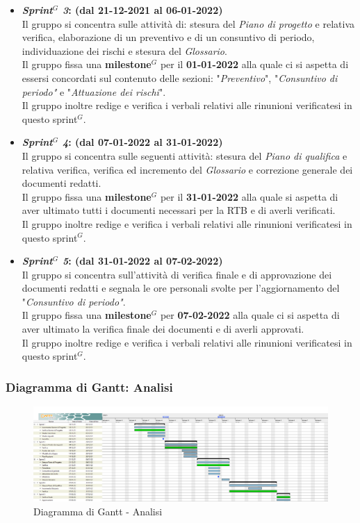 \begin{itemize}
    \item \textbf{\textit{Sprint$^{G}$ 3}: (dal 21-12-2021 al 06-01-2022)}\\
    Il gruppo si concentra sulle attività di: stesura del \textit{Piano di progetto} e relativa verifica, elaborazione di un preventivo e di un consuntivo di periodo, individuazione dei rischi e stesura del \textit{Glossario}.\\
    Il gruppo fissa una \textbf{milestone$^{G}$} per il \textbf{01-01-2022} alla quale ci si aspetta di essersi concordati sul contenuto delle sezioni: "\textit{Preventivo}", "\textit{Consuntivo di periodo"} e "\textit{Attuazione dei rischi}".\\
    Il gruppo inoltre redige e verifica i verbali relativi alle rinunioni verificatesi in questo sprint$^{G}$.

    \item \textbf{\textit{Sprint$^{G}$ 4}: (dal 07-01-2022 al 31-01-2022)}\\
    Il gruppo si concentra sulle seguenti attività: stesura del \textit{Piano di qualifica} e relativa verifica, verifica ed incremento del \textit{Glossario} e correzione generale dei documenti redatti.\\
    Il gruppo fissa una \textbf{milestone$^{G}$} per il \textbf{31-01-2022} alla quale si aspetta di aver ultimato tutti i documenti necessari per la RTB e di averli verificati.\\
    Il gruppo inoltre redige e verifica i verbali relativi alle rinunioni verificatesi in questo sprint$^{G}$.

    \item \textbf{\textit{Sprint$^{G}$ 5}: (dal 31-01-2022 al 07-02-2022)}\\
    Il gruppo si concentra sull'attività di verifica finale e di approvazione dei documenti redatti  e segnala le ore personali svolte per l'aggiornamento del "\textit{Consuntivo di periodo"}. \\
    Il gruppo fissa una \textbf{milestone$^{G}$} per \textbf{07-02-2022} alla quale ci si aspetta di aver ultimato la verifica finale dei documenti e di averli approvati.\\
    Il gruppo inoltre redige e verifica i verbali relativi alle rinunioni verificatesi in questo sprint$^{G}$.
\end{itemize}
\newpage
\subsubsection{Diagramma di Gantt: Analisi}
\begin{figure}[h!]
    \centering
    \includegraphics[scale=0.22]{../../assets/Diagrammi_Gantt/Analisi.png}
    \caption{Diagramma di Gantt - Analisi}
\end{figure}

